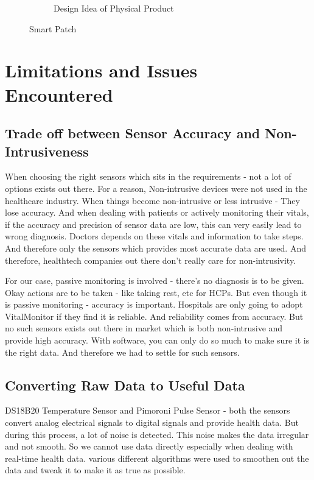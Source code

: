 \begin{figure}[h!]
\begin{subfigure}[b]{0.45\linewidth}
        \caption{Design Idea of Physical Product}
        \label{fig:fig-design}
    \end{subfigure}
    \caption{Smart Patch}
    \label{fig:fig-smartpatch}
\end{figure}

\section{Limitations and Issues Encountered}

\subsection{Trade off between Sensor Accuracy and Non-Intrusiveness}
When choosing the right sensors which sits in the requirements - not a lot of options exists out there. For a reason, Non-intrusive devices were not used in the healthcare industry. When things become non-intrusive or less intrusive - They lose accuracy. And when dealing with patients or actively monitoring their vitals, if the accuracy and precision of sensor data are low, this can very easily lead to wrong diagnosis. Doctors depends on these vitals and information to take steps. And therefore only the sensors which provides most accurate data are used. And therefore, healthtech companies out there don't really care for non-intrusivity.

For our case, passive monitoring is involved - there's no diagnosis is to be given. Okay actions are to be taken - like taking rest, etc for HCPs. But even though it is passive monitoring - accuracy is important. Hospitals are only going to adopt VitalMonitor if they find it is reliable. And reliability comes from accuracy. But no such sensors exists out there in market which is both non-intrusive and provide high accuracy. With software, you can only do so much to make sure it is the right data. And therefore we had to settle for such sensors. 



\subsection{Converting Raw Data to Useful Data}
DS18B20 Temperature Sensor and Pimoroni Pulse Sensor - both the sensors convert analog electrical signals to digital signals and provide health data. But during this process, a lot of noise is detected. This noise makes the data irregular and not smooth. So we cannot use data directly especially when dealing with real-time health data. various different algorithms were used to smoothen out the data and tweak it to make it as true as possible. 

